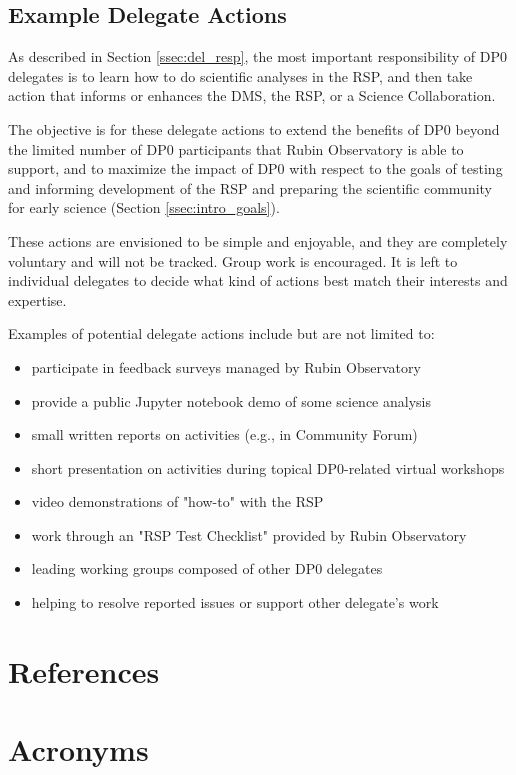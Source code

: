 \documentclass[DM,lsstdraft,authoryear,toc]{lsstdoc}
\begin{document}
\subsection{Example Delegate Actions}\label{ssec:res_act}

As described in Section \ref{ssec:del_resp}, the most important responsibility of DP0 delegates is to learn how to do scientific analyses in the RSP, and then take action that informs or enhances the DMS, the RSP, or a Science Collaboration. 

The objective is for these delegate actions to extend the benefits of DP0 beyond the limited number of DP0 participants that Rubin Observatory is able to support, and to maximize the impact of DP0 with respect to the goals of testing and informing development of the RSP and preparing the scientific community for early science (Section \ref{ssec:intro_goals}). 

These actions are envisioned to be simple and enjoyable, and they are completely voluntary and will not be tracked.
Group work is encouraged.
It is left to individual delegates to decide what kind of actions best match their interests and expertise. 

Examples of potential delegate actions include but are not limited to:
\begin{itemize}
\item participate in feedback surveys managed by Rubin Observatory
\item provide a public Jupyter notebook demo of some science analysis
\item small written reports on activities (e.g., in Community Forum)
\item short presentation on activities during topical DP0-related virtual workshops
\item video demonstrations of "how-to" with the RSP
\item work through an "RSP Test Checklist" provided by Rubin Observatory
\item leading working groups composed of other DP0 delegates
\item helping to resolve reported issues or support other delegate's work
\end{itemize}


\appendix
\section{References} \label{sec:bib}
\renewcommand{\refname}{} %


\section{Acronyms}



% 
\end{document}
